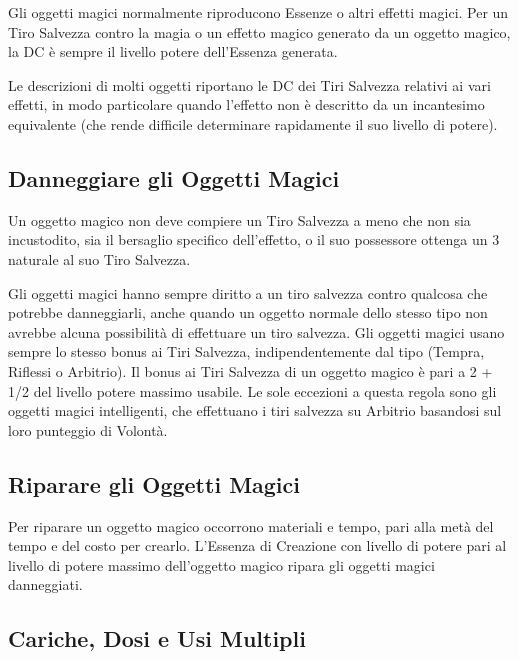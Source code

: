 \documentclass[a4paper,11pt,twoside,openany]{book}
\begin{document}
\label{tiri-salvezza-contro-i-poteri-degli-oggetti-magici}

Gli oggetti magici normalmente riproducono Essenze o altri effetti magici. Per un Tiro Salvezza contro la magia o un effetto magico generato da un oggetto magico, la DC è sempre il livello potere dell'Essenza generata.

Le descrizioni di molti oggetti riportano le DC dei Tiri Salvezza relativi ai vari effetti, in modo particolare quando l'effetto non è descritto da un incantesimo equivalente (che rende difficile determinare rapidamente il suo livello di potere).


\subsection{Danneggiare gli Oggetti Magici}

\label{danneggiare-gli-oggetti-magici}

Un oggetto magico non deve compiere un Tiro Salvezza a meno che non sia incustodito, sia il bersaglio specifico dell'effetto, o il suo possessore ottenga un 3 naturale al suo Tiro Salvezza.

Gli oggetti magici hanno sempre diritto a un tiro salvezza contro qualcosa che potrebbe danneggiarli, anche quando un oggetto normale dello stesso tipo non avrebbe alcuna possibilità di effettuare un tiro salvezza. Gli oggetti magici usano sempre lo stesso bonus ai Tiri Salvezza, indipendentemente dal tipo (Tempra, Riflessi o Arbitrio). Il bonus ai Tiri Salvezza di un oggetto magico è pari a 2 + 1/2 del livello potere massimo usabile. Le sole eccezioni a questa regola sono gli oggetti magici intelligenti, che effettuano i tiri salvezza su Arbitrio basandosi sul loro punteggio di Volontà.


\subsection{Riparare gli Oggetti Magici}
\label{riparare-gli-oggetti-magici}

Per riparare un oggetto magico occorrono materiali e tempo, pari alla metà del tempo e del costo per crearlo. L'Essenza di Creazione con livello di potere pari al livello di potere massimo dell'oggetto magico ripara gli oggetti magici danneggiati.


\subsection{Cariche, Dosi e Usi Multipli}
\end{document}
